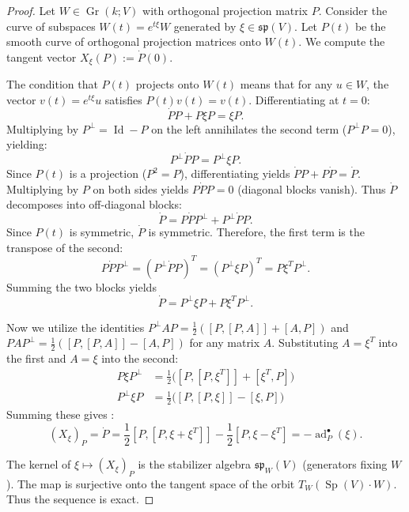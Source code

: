\documentclass[12pt, final]{article}
\def\ad{\operatorname{ad}}
\def\Sp{\operatorname{Sp}}
\def\Gr{\operatorname{Gr}}
\def\Id{\operatorname{Id}}
\def\sp{\mathfrak{sp}}
\begin{document}
\begin{proof}
Let $W \in \Gr(k; V)$ with orthogonal projection matrix $P$. Consider the curve of subspaces $W(t) = e^{t\xi} W$ generated by $\xi \in \sp(V)$. Let $P(t)$ be the smooth curve of orthogonal projection matrices onto $W(t)$. We compute the tangent vector $X_\xi(P) := \dot{P}(0)$.

The condition that $P(t)$ projects onto $W(t)$ means that for any $u \in W$, the vector $v(t) = e^{t\xi}u$ satisfies $P(t) v(t) = v(t)$. Differentiating at $t=0$:
\[ \dot{P} P + P \xi P = \xi P. \]
Multiplying by $P^\perp = \Id - P$ on the left annihilates the second term ($P^\perp P = 0$), yielding:
\[ P^\perp \dot{P} P = P^\perp \xi P. \]
Since $P(t)$ is a projection ($P^2=P$), differentiating yields $\dot{P}P + P\dot{P} = \dot{P}$. Multiplying by $P$ on both sides yields $P\dot{P}P = 0$ (diagonal blocks vanish). Thus $\dot{P}$ decomposes into off-diagonal blocks:
\[ \dot{P} = P \dot{P} P^\perp + P^\perp \dot{P} P. \]
Since $P(t)$ is symmetric, $\dot{P}$ is symmetric. Therefore, the first term is the transpose of the second:
\[ P \dot{P} P^\perp = (P^\perp \dot{P} P)^T = (P^\perp \xi P)^T = P \xi^T P^\perp. \]
Summing the two blocks yields
\[ \dot{P} = P^\perp \xi P + P \xi^T P^\perp. \]

Now we utilize the identities $P^\perp A P = \frac{1}{2}([P, [P, A]] + [A, P])$ and $P A P^\perp = \frac{1}{2}([P, [P, A]] - [A, P])$ for any matrix $A$.
Substituting $A=\xi^T$ into the first and $A=\xi$ into the second:
\begin{align*}
P \xi P^\perp &= \frac{1}{2} \big( [P, [P, \xi^T]] + [\xi^T, P] \big) \\
P^\perp \xi P &= \frac{1}{2} \big( [P, [P, \xi]] - [\xi, P] \big)
\end{align*}
Summing these gives :
\[
(X_\xi)_P= \dot{P} = \frac{1}{2} \left[ P, \left[ P, \xi + \xi^T \right] \right] - \frac{1}{2} \left[ P, \xi - \xi^T \right] = -\ad_P^\bullet(\xi).
\]

The kernel of $\xi \mapsto (X_\xi)_P$ is the stabilizer algebra $\sp_W(V)$ (generators fixing $W$). The map is surjective onto the tangent space of the orbit $T_W(\Sp(V)\cdot W)$. Thus the sequence is exact.
\end{proof}
\end{document}
